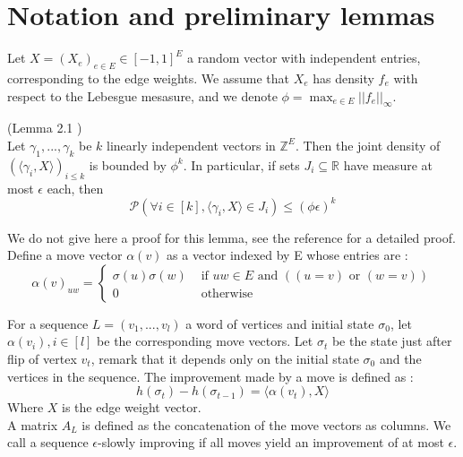 \section{Notation and preliminary lemmas}

Let $X = (X_e)_{e \in E} \in [-1, 1]^E$ a random vector with independent entries, corresponding to the edge weights. We assume that $X_e$ has density $f_e$ with respect to the Lebesgue mesasure, and we denote $\phi = \max_{e \in E}||f_e||_\infty$. 

\begin{lemma} (Lemma 2.1 \cite{angel2016local})\\
\label{noise}
Let $\gamma_1, ..., \gamma_k$ be $k$ linearly independent vectors in $\mathbb{Z}^E$. Then the joint density of $(\langle \gamma_i, X \rangle)_{i \leq k}$ is bounded by $\phi^k$. In particular, if sets $J_i \subseteq \mathbb R$ have measure at most $\epsilon$ each, then 
\begin{equation*}
\mathcal{P} (\forall i \in [k], \langle \gamma_i, X \rangle \in J_i) \leq (\phi \epsilon)^k
\end{equation*}
\end{lemma}

We do not give here a proof for this lemma, see the reference \cite{angel2016local} for a detailed proof.\\
Define a move vector $\alpha(v)$ as a vector indexed by E whose entries are :
\begin{equation*}
\alpha(v)_{uw} = 
\begin{cases}
\sigma(u)\sigma(w) &\text{ if } uw \in E \text{ and }( (u = v) \text{ or } (w = v)) \\
 0 &\text{ otherwise}
 \end{cases}
\end{equation*} 

For a sequence $L = (v_1, ..., v_l)$ a word of vertices and initial state $\sigma_0$, let $\alpha(v_i), i \in [l]$ be the corresponding move vectors. Let $\sigma_t$ be the state just after flip of vertex $v_t$, remark that it depends only on the initial state $\sigma_0$ and the vertices in the sequence.
The improvement made by a move is defined as :
\begin{equation*}
h(\sigma_t) - h(\sigma_{t-1}) = \langle \alpha(v_t), X \rangle
\end{equation*}
Where $X$ is the edge weight vector.\\ 
A matrix $A_L$ is defined as the concatenation of the move vectors as columns. We call a sequence $\epsilon$-slowly improving if all moves yield an improvement of at most $\epsilon$.


